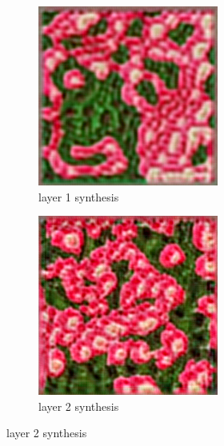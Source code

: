 \documentclass[11pt, oneside]{article}   	%
\begin{document}
\begin{figure}[H]
    \centering
    \begin{subfigure}[b]{0.45\textwidth}
        \includegraphics[width=\textwidth]{figure/rose/layer_01_001}
        \caption{layer 1 synthesis}
    \end{subfigure}
    \begin{subfigure}[b]{0.45\textwidth}
        \includegraphics[width=\textwidth]{figure/rose/layer_02_001}
        \caption{layer 2 synthesis}
    \end{subfigure}
    

\end{figure}
\end{document}

